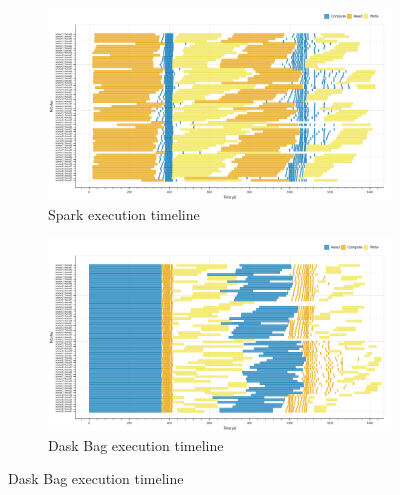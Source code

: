 \documentclass[conference]{IEEEtran}
\begin{document}

\begin{figure}[!htb]
    \centering
    \begin{subfigure}[b]{\columnwidth}
        \includegraphics[clip,width=\columnwidth]{images/spark_inc_baseline_gantt.png}
        \caption{Spark execution timeline}\label{fig:inc_spark_gantt}
    \end{subfigure}
    \hfill
    \begin{subfigure}[b]{\columnwidth}
        \includegraphics[clip,width=\columnwidth]{images/Dask_bag_inc_baseline_gantt.png}%
        \caption{Dask Bag execution timeline}\label{fig:inc_dask_bag_gantt}

\end{subfigure}
\end{figure}
\end{document}
